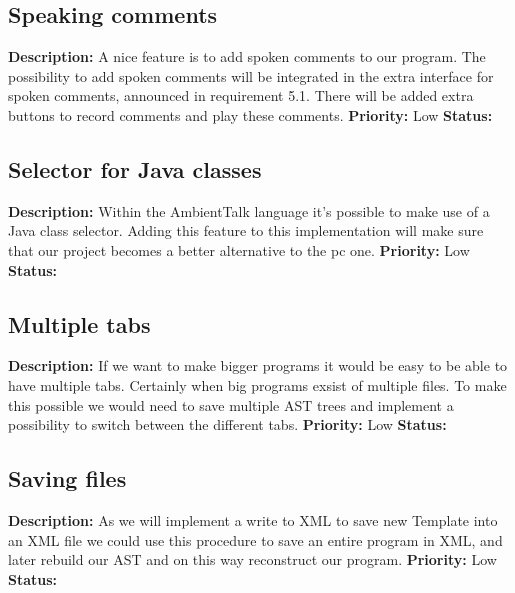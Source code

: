 \documentclass{article}
\begin{document}
\subsection{Speaking comments}
\textbf{Description: } A nice feature is to add spoken comments to our program. The possibility to add spoken comments will be integrated in the
extra interface for spoken comments, announced in requirement 5.1. There will be added extra buttons to record comments and play these comments.\newline
\textbf{Priority:} Low \newline
\textbf{Status: } \newline
\subsection{Selector for Java classes}
\textbf{Description: } Within the AmbientTalk language it's possible to make use of a Java class selector. Adding this feature to this implementation
will make sure that our project becomes a better alternative to the pc one.\newline
\textbf{Priority:} Low \newline
\textbf{Status: } \newline
\subsection{Multiple tabs}
\textbf{Description: } If we want to make bigger programs it would be easy to be able to have multiple tabs. Certainly when big programs exsist of multiple files. To make this possible we would need
to save multiple AST trees and implement a possibility to switch between the different tabs.\newline
\textbf{Priority:} Low \newline
\textbf{Status: }
\subsection{Saving files}
\textbf{Description: } As we will implement a write to XML to save new Template into an XML file we could use this procedure to save an entire program in XML, and later rebuild our AST and on this way 
reconstruct our program. \newline
\textbf{Priority:} Low \newline
\textbf{Status: }
\end{document}
